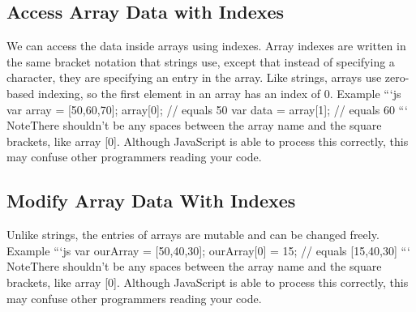 \documentclass{article}%
\begin{document}
%
\subsection{Access Array Data with Indexes}%
\label{subsec:AccessArrayDatawithIndexes}%
We can access the data inside arrays using indexes.\newline%
Array indexes are written in the same bracket notation that strings use, except that instead of specifying a character, they are specifying an entry in the array. Like strings, arrays use zero{-}based indexing, so the first element in an array has an index of 0.\newline%
Example\newline%
```js\newline%
var array = {[}50,60,70{]};\newline%
array{[}0{]}; // equals 50\newline%
var data = array{[}1{]};  // equals 60\newline%
```\newline%
NoteThere shouldn't be any spaces between the array name and the square brackets, like array {[}0{]}. Although JavaScript is able to process this correctly, this may confuse other programmers reading your code.\newline%

%
\subsection{Modify Array Data With Indexes}%
\label{subsec:ModifyArrayDataWithIndexes}%
Unlike strings, the entries of arrays are mutable and can be changed freely.\newline%
Example\newline%
```js\newline%
var ourArray = {[}50,40,30{]};\newline%
ourArray{[}0{]} = 15; // equals {[}15,40,30{]}\newline%
```\newline%
NoteThere shouldn't be any spaces between the array name and the square brackets, like array {[}0{]}. Although JavaScript is able to process this correctly, this may confuse other programmers reading your code.\newline%

%
\end{document}
